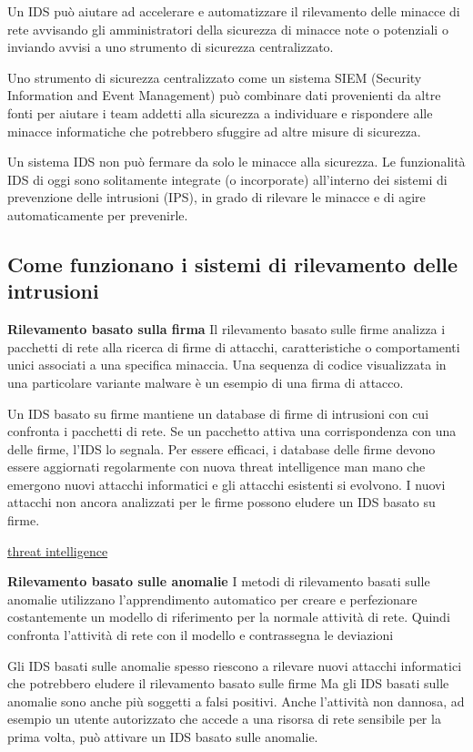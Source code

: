 Un IDS può aiutare ad accelerare e automatizzare il rilevamento delle minacce di rete avvisando gli amministratori della 
sicurezza di minacce note o potenziali o inviando avvisi a uno strumento di sicurezza centralizzato. 

Uno strumento di sicurezza centralizzato come un sistema SIEM (Security Information and Event Management) può 
combinare dati provenienti da altre fonti per aiutare i team addetti alla sicurezza a individuare e rispondere alle 
minacce informatiche che potrebbero sfuggire ad altre misure di sicurezza.

Un sistema IDS non può fermare da solo le minacce alla sicurezza. Le funzionalità IDS di oggi sono solitamente 
integrate (o incorporate) all'interno dei sistemi di prevenzione delle intrusioni (IPS), in grado di rilevare le 
minacce e di agire automaticamente per prevenirle.


\subsection{Come funzionano i sistemi di rilevamento delle intrusioni}

\textbf{Rilevamento basato sulla firma}
Il rilevamento basato sulle firme analizza i pacchetti di rete alla ricerca di firme di attacchi, caratteristiche o 
comportamenti unici associati a una specifica minaccia. 
Una sequenza di codice visualizzata in una particolare variante malware è un esempio di una firma di attacco.

Un IDS basato su firme mantiene un database di firme di intrusioni con cui confronta i pacchetti di rete. 
Se un pacchetto attiva una corrispondenza con una delle firme, l'IDS lo segnala. 
Per essere efficaci, i database delle firme devono essere aggiornati regolarmente con nuova threat intelligence man mano che 
emergono nuovi attacchi informatici e gli attacchi esistenti si evolvono. 
I nuovi attacchi non ancora analizzati per le firme possono eludere un IDS basato su firme.

\hyperlink{https://www.ibm.com/it-it/topics/threat-intelligence}{threat intelligence}


\textbf{Rilevamento basato sulle anomalie}
I metodi di rilevamento basati sulle anomalie utilizzano l'apprendimento automatico per creare e perfezionare 
costantemente un modello di riferimento per la normale attività di rete. 
Quindi confronta l'attività di rete con il modello e contrassegna le deviazioni

Gli IDS basati sulle anomalie spesso riescono a rilevare nuovi attacchi informatici che potrebbero eludere il rilevamento basato sulle firme
Ma gli IDS basati sulle anomalie sono anche più soggetti a falsi positivi. 
Anche l'attività non dannosa, ad esempio un utente autorizzato che accede a una risorsa di rete sensibile per la prima volta, può attivare un IDS basato sulle anomalie.


